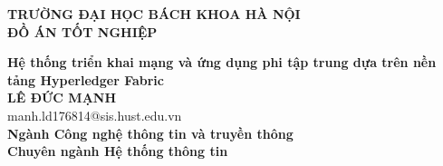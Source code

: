 \documentclass[DoAn.tex]{subfiles}
\begin{document}
\begin{titlepage}
\thispagestyle{empty}
\begin{center}

{\textbf{\large{TRƯỜNG ĐẠI HỌC BÁCH KHOA HÀ NỘI}}}\\[4cm]

{\textbf{\huge{ ĐỒ ÁN TỐT NGHIỆP}}}\\[1cm]
{\textbf{\Large{Hệ thống triển khai mạng và ứng dụng phi tập trung dựa trên nền tảng Hyperledger Fabric}}\\[1cm]

{\textbf{\large{LÊ ĐỨC MẠNH}}}\\
{\large{manh.ld176814@sis.hust.edu.vn}}\\[0.5cm]

{\textbf{\large{Ngành Công nghệ thông tin và truyền thông}}}\\
{\textbf{\large{Chuyên ngành Hệ thống thông tin}}}\\

\vspace{2cm}
\begin{table}[H]
\centering
{}
\end{table}}
\end{center}



\end{titlepage}
\end{document}

